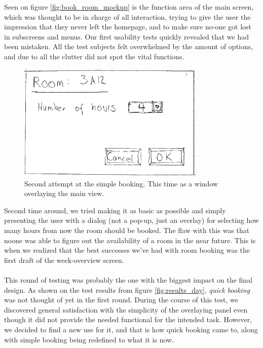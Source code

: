 Seen on figure \ref{fig:book_room_mockup} is the function area of the main screen, which was thought to be in charge of all interaction, trying to give the user the impression that they never left the homepage, and to make sure no-one got lost in subscreens and menus. Our first usability tests quickly revealed that we had been mistaken. All the test subjects felt overwhelmed by the amount of options, and due to all the clutter did not spot the vital functions.
\pagebreak
\begin{figure}[htb]
\begin{center}
\leavevmode
\includegraphics[width=0.8\textwidth]{images/bookRoomMockup2}
\end{center}
\caption{Second attempt at the simple booking. This time as a window overlaying the main view.}
\label{fig:book_room_mockup2}
\end{figure}

Second time around, we tried making it as basic as possible and simply presenting the user with a dialog (not a pop-up, just an overlay) for selecting how many hours from now the room should be booked. The flaw with this was that noone was able to figure out the availability of a room in the near future. This is when we realized that the best successes we've had with room booking was the first draft of the week-overview screen. \\
\\
This round of testing was probably the one with the biggest impact on the final design. As shown on the test results from figure \ref{fig:results_day}, \emph{quick booking} was not thought of yet in the first round. During the course of this test, we discovered general satisfaction with the simplicity of the overlaying panel even though it did not provide the needed functional for the intended task. However, we decided to find a new use for it, and that is how quick booking came to, along with simple booking being redefined to what it is now.

